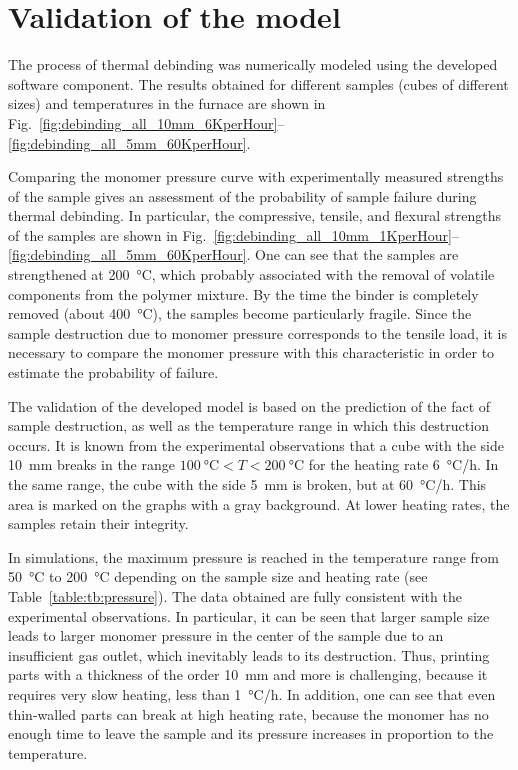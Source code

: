 \documentclass{article}
\begin{document}
\section{Validation of the model}

The process of thermal debinding was numerically modeled using the developed software component.
The results obtained for different samples (cubes of different sizes) and temperatures in the furnace are shown
in Fig.~\ref{fig:debinding_all_10mm_6KperHour}--\ref{fig:debinding_all_5mm_60KperHour}.

Comparing the monomer pressure curve with experimentally measured strengths
of the sample gives an assessment of the probability of sample failure during thermal debinding.
In particular, the compressive, tensile, and flexural strengths of the samples
are shown in Fig.~\ref{fig:debinding_all_10mm_1KperHour}--\ref{fig:debinding_all_5mm_60KperHour}.
One can see that the samples are strengthened at \SI{200}{\celsius},
which probably associated with the removal of volatile components from the polymer mixture.
By the time the binder is completely removed (about \SI{400}{\celsius}),
the samples become particularly fragile.
Since the sample destruction due to monomer pressure corresponds to the tensile load,
it is necessary to compare the monomer pressure with this characteristic
in order to estimate the probability of failure.

The validation of the developed model is based on the prediction of the fact of sample destruction,
as well as the temperature range in which this destruction occurs.
It is known from the experimental observations that a cube with the side \SI{10}{\mm}
breaks in the range $\SI{100}{\celsius}<T<\SI{200}{\celsius}$ for the heating rate \SI{6}{\celsius/\hour}.
In the same range, the cube with the side \SI{5}{\mm} is broken, but at \SI{60}{\celsius/\hour}.
This area is marked on the graphs with a gray background.
At lower heating rates, the samples retain their integrity.

In simulations, the maximum pressure is reached in the temperature range
from \SI{50}{\celsius} to \SI{200}{\celsius}
depending on the sample size and heating rate (see Table~\ref{table:tb:pressure}).
The data obtained are fully consistent with the experimental observations.
In particular, it can be seen that larger sample size leads to larger monomer pressure 
in the center of the sample due to an insufficient gas outlet,
which inevitably leads to its destruction.
Thus, printing parts with a thickness of the order \SI{10}{\mm} and more is challenging,
because it requires very slow heating, less than \SI{1}{\celsius/\hour}.
In addition, one can see that even thin-walled parts can break at high heating rate,
because the monomer has no enough time to leave the sample
and its pressure increases in proportion to the temperature.
\end{document}
